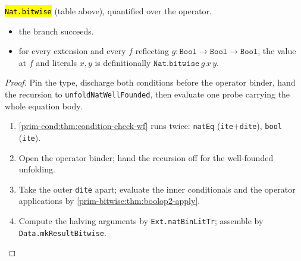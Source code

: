 \begin{theorem}
  \label{prim-bitwise:thm:checknatbitwise-wf}
  \leanok

   \hl{\texttt{Nat.bitwise}} (table above), quantified over the operator.
  \begin{itemize}
  \item {} the branch succeeds.
  \item {} for every extension and every $f$ reflecting $g : \mathtt{Bool} \to
    \mathtt{Bool} \to \mathtt{Bool}$, the value at $f$ and literals $x, y$ is definitionally
    $\mathtt{Nat.bitwise}\,g\,x\,y$.
  \end{itemize}
\end{theorem}
\begin{proof}
  \leanok
   Pin the type, discharge both conditions before the operator binder, hand the
  recursion to \texttt{unfoldNatWellFounded}, then evaluate one probe carrying the whole equation
  body.
  \begin{enumerate}
  \item \ref{prim-cond:thm:condition-check-wf} runs twice: \texttt{natEq} (\texttt{ite}+\texttt{dite}),
    \texttt{bool} (\texttt{ite}).
  \item Open the operator binder; hand the recursion off for the well-founded unfolding.
  \item Take the outer \texttt{dite} apart; evaluate the inner conditionals and the operator
    applications by \ref{prim-bitwise:thm:boolop2-apply}.
  \item Compute the halving arguments by \texttt{Ext.natBinLitTr}; assemble by
    \texttt{Data.mkResultBitwise}.
  \end{enumerate}
\end{proof}

